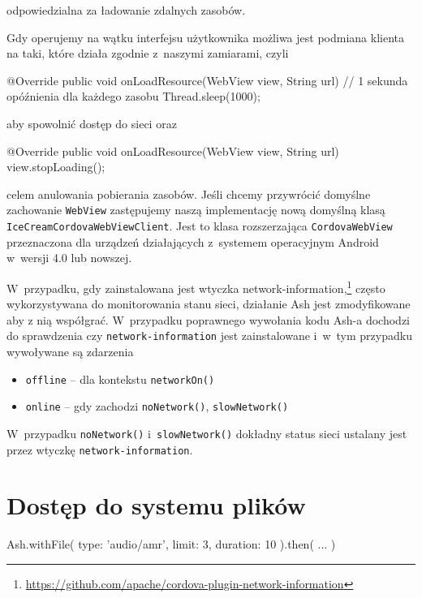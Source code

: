 \documentclass{xmgr}
\begin{document}
\noindent odpowiedzialna za ładowanie zdalnych zasobów.

Gdy operujemy na wątku interfejsu użytkownika możliwa jest podmiana klienta na taki, które działa zgodnie z~naszymi zamiarami, czyli 

\begin{javacode}
   @Override
   public void onLoadResource(WebView view, String url) {
       // 1 sekunda opóźnienia dla każdego zasobu
       Thread.sleep(1000); 
   }
\end{javacode}

\noindent aby spowolnić dostęp do sieci oraz

\begin{javacode}
   @Override
   public void onLoadResource(WebView view, String url) {
       view.stopLoading();
   }
\end{javacode}

\noindent celem anulowania pobierania zasobów. Jeśli chcemy przywrócić domyślne zachowanie \texttt{WebView} zastępujemy naszą implementację nową domyślną klasą \texttt{IceCreamCordovaWebViewClient}. Jest to klasa rozszerzająca \texttt{CordovaWebView} przeznaczona dla urządzeń działających z~systemem operacyjnym Android w~wersji 4.0 lub nowszej.

W~przypadku, gdy zainstalowana jest wtyczka network-information,\footnote{ \url{https://github.com/apache/cordova-plugin-network-information} } często wykorzystywana do monitorowania stanu sieci, działanie Ash jest zmodyfikowane aby z nią współgrać. W~przypadku poprawnego wywołania kodu Ash-a dochodzi do sprawdzenia czy \texttt{network-information} jest zainstalowane i~w~tym przypadku wywoływane są zdarzenia

\begin{itemize}
  \item \texttt{offline} -- dla kontekstu \texttt{networkOn()} 
  \item \texttt{online} -- gdy zachodzi \texttt{noNetwork()}, \texttt{slowNetwork()}
\end{itemize}

W~przypadku \texttt{noNetwork()} i~\texttt{slowNetwork()} dokładny status sieci ustalany jest przez wtyczkę \texttt{network-information}.

\section{Dostęp do systemu plików}

\begin{javascriptcode}
Ash.withFile({ 
    type: 'audio/amr', 
    limit: 3, 
    duration: 10
 }).then( ... )
\end{javascriptcode}
\end{document}
